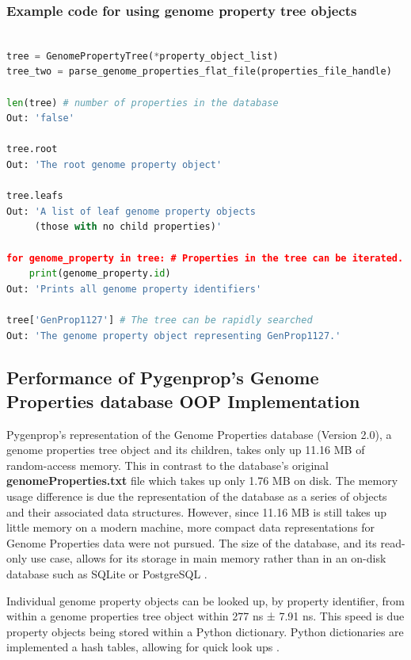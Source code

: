 \pagebreak

\subsubsection{Example code for using genome property tree objects}

\begin{lstlisting}[language=Python]

tree = GenomePropertyTree(*property_object_list)
tree_two = parse_genome_properties_flat_file(properties_file_handle)
	
len(tree) # number of properties in the database
Out: 'false'

tree.root
Out: 'The root genome property object'

tree.leafs
Out: 'A list of leaf genome property objects 
     (those with no child properties)'

for genome_property in tree: # Properties in the tree can be iterated.
	print(genome_property.id)
Out: 'Prints all genome property identifiers'

tree['GenProp1127'] # The tree can be rapidly searched
Out: 'The genome property object representing GenProp1127.'

\end{lstlisting}

\subsection{Performance of Pygenprop's Genome Properties database OOP Implementation}

Pygenprop's representation of the Genome Properties database (Version 2.0), a genome properties tree object and its children, takes only up 11.16 MB of random-access memory. This in contrast to the database's original \textbf{genomeProperties.txt} file which takes up only 1.76 MB on disk. The memory usage difference is due the representation of the database as a series of objects and their associated data structures. However, since 11.16 MB is still takes up little memory on a modern machine, more compact data representations for Genome Properties data were not pursued. The size of the database, and its read-only use case, allows for its storage in main memory rather than in an on-disk database such as SQLite \cite{owens2006definitive} or PostgreSQL \cite{momjian2001postgresql}.

Individual genome property objects can be looked up, by property identifier, from within a genome properties tree object within 277 ns ± 7.91 ns. This speed is due property objects being stored within a Python dictionary. Python dictionaries are implemented a hash tables, allowing for quick look ups \cite{van1995python}.

